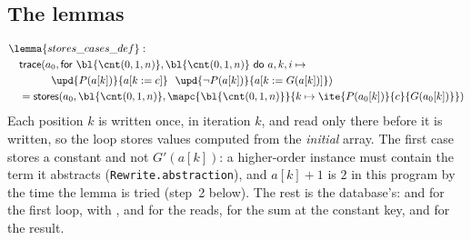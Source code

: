 \subsection{The lemmas}
\begin{align*}
  &\lemma{stores\_cases\_def}:\\
  &\quad \mathsf{trace}(a_0, \mathsf{for}\ \bl{\cnt(0, 1, n)}, \bl{\cnt(0, 1, n)}\ \mathsf{do}\ a, k, i \mapsto {}\\
  &\qquad\qquad \upd{P(a[k])}{a[k := c]}\ \ \upd{\neg P(a[k])}{a[k := G(a[k])]})\\
  &\quad = \mathsf{stores}(a_0, \bl{\cnt(0, 1, n)}, \mapc{\bl{\cnt(0, 1, n)}}{k \mapsto \ite{P(a_0[k])}{c}{G(a_0[k])}})
\end{align*}
Each position $k$ is written once, in iteration $k$, and read only there before it is written, so the loop
stores values computed from the \emph{initial} array. The first case stores a constant and not $G'(a[k])$: a
higher-order instance must contain the term it abstracts (\texttt{Rewrite.abstraction}), and $a[k] + 1$ is
$2$ in this program by the time the lemma is tried (step~2 below). The rest is the database's:
 and  for the first loop,  with
,  and  for the reads,
 for the sum at the constant key,  and
 for the result.


